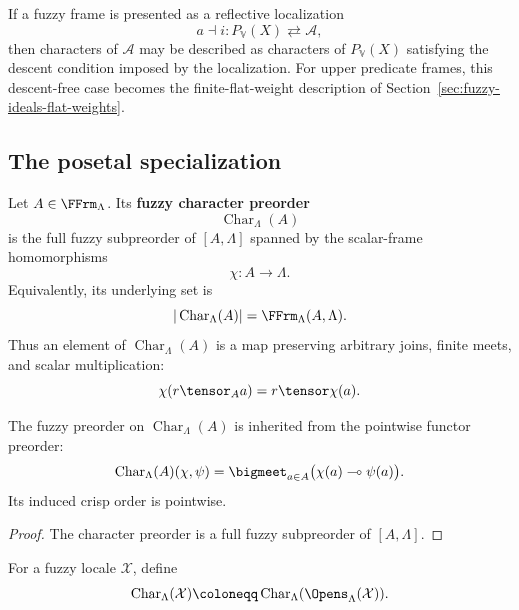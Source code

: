 \begin{remark}
\label{rem:character-universe-convention}
If a fuzzy frame is presented as a reflective localization
\[
    a\dashv i:
    P_{\mathbb V}(X)\rightleftarrows\mathcal A,
\]
then characters of \(\mathcal A\) may be described as characters of
\(P_{\mathbb V}(X)\) satisfying the descent condition imposed by the localization.
For upper predicate frames, this descent-free case becomes the finite-flat-weight
description of Section~\ref{sec:fuzzy-ideals-flat-weights}.
\end{remark}

\subsection{The posetal specialization}
\label{subsec:fuzzy-characters-posetal}

\begin{definition}
\label{def:fuzzy-character-posetal}
Let \(A\in\FFrm_\Lambda\).  Its \textbf{fuzzy character preorder}
\[
    \operatorname{Char}_\Lambda(A)
\]
is the full fuzzy subpreorder of \([A,\Lambda]\) spanned by the scalar-frame
homomorphisms
\[
    \chi:A\to\Lambda.
\]
Equivalently, its underlying set is
\[
    |\operatorname{Char}_\Lambda(A)|
    =
    \FFrm_\Lambda(A,\Lambda).
\]
Thus an element of \(\operatorname{Char}_\Lambda(A)\) is a map preserving arbitrary
joins, finite meets, and scalar multiplication:
\[
    \chi(r\tensor_A a)=r\tensor\chi(a).
\]
\end{definition}

\begin{proposition}
\label{prop:fuzzy-character-preorder}
The fuzzy preorder on \(\operatorname{Char}_\Lambda(A)\) is inherited from the
pointwise functor preorder:
\[
    \operatorname{Char}_\Lambda(A)(\chi,\psi)
    =
    \bigmeet_{a\in A}
    \bigl(\chi(a)\multimap\psi(a)\bigr).
\]
Its induced crisp order is pointwise.
\end{proposition}

\begin{proof}
The character preorder is a full fuzzy subpreorder of \([A,\Lambda]\).
\end{proof}

\begin{definition}
\label{def:fuzzy-character-locale-posetal}
For a fuzzy locale \(\mathcal X\), define
\[
    \operatorname{Char}_\Lambda(\mathcal X)
    \coloneqq
    \operatorname{Char}_\Lambda(\Opens_\Lambda(\mathcal X)).
\]
\end{definition}

